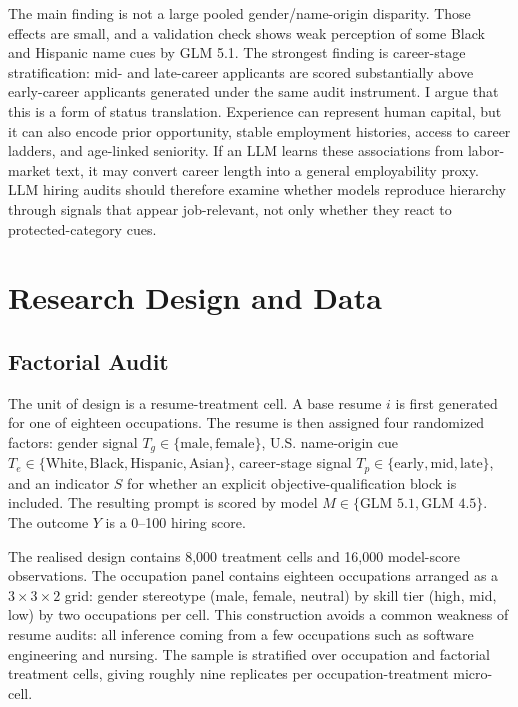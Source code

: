 \documentclass[10pt,twocolumn,letterpaper]{article}
\begin{document}
The main finding is not a large pooled gender/name-origin disparity. Those effects are small, and a validation check shows weak perception of some Black and Hispanic name cues by GLM 5.1. The strongest finding is career-stage stratification: mid- and late-career applicants are scored substantially above early-career applicants generated under the same audit instrument. I argue that this is a form of status translation. Experience can represent human capital, but it can also encode prior opportunity, stable employment histories, access to career ladders, and age-linked seniority. If an LLM learns these associations from labor-market text, it may convert career length into a general employability proxy. LLM hiring audits should therefore examine whether models reproduce hierarchy through signals that appear job-relevant, not only whether they react to protected-category cues.

\section{Research Design and Data}

\subsection{Factorial Audit}

The unit of design is a resume-treatment cell. A base resume $i$ is first generated for one of eighteen occupations. The resume is then assigned four randomized factors: gender signal $T_g \in \{\text{male},\text{female}\}$, U.S. name-origin cue $T_e \in \{\text{White},\text{Black},\text{Hispanic},\text{Asian}\}$, career-stage signal $T_p \in \{\text{early},\text{mid},\text{late}\}$, and an indicator $S$ for whether an explicit objective-qualification block is included. The resulting prompt is scored by model $M \in \{\text{GLM 5.1},\text{GLM 4.5}\}$. The outcome $Y$ is a 0--100 hiring score.

The realised design contains 8,000 treatment cells and 16,000 model-score observations. The occupation panel contains eighteen occupations arranged as a $3 \times 3 \times 2$ grid: gender stereotype (male, female, neutral) by skill tier (high, mid, low) by two occupations per cell. This construction avoids a common weakness of resume audits: all inference coming from a few occupations such as software engineering and nursing. The sample is stratified over occupation and factorial treatment cells, giving roughly nine replicates per occupation-treatment micro-cell.
\end{document}
